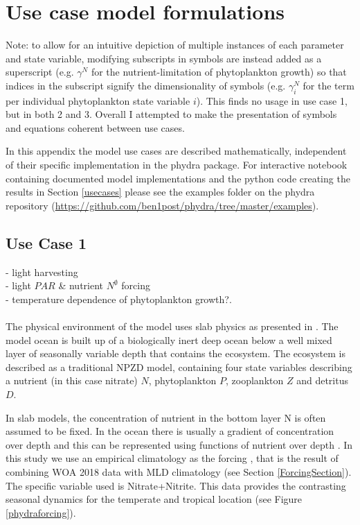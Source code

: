 \documentclass[template.tex]{subfiles}
\begin{document}
\section{Use case model formulations}

Note: to allow for an intuitive depiction of multiple instances of each parameter and state variable, modifying subscripts in symbols are instead added as a superscript (e.g. $\gamma^{N}$ for the nutrient-limitation of phytoplankton growth) so that indices in the subscript signify the dimensionality of symbols (e.g. $\gamma^{N}_i$ for the term per individual phytoplankton state variable $i$). This finds no usage in use case 1, but in both 2 and 3.
Overall I attempted to make the presentation of symbols and equations coherent between use cases.

In this appendix the model use cases are described mathematically, independent of their specific implementation in the phydra package. For interactive notebook containing documented model implementations and the python code creating the results in Section \ref{usecases} please see the examples folder on the phydra repository (\url{https://github.com/ben1post/phydra/tree/master/examples}).


\subsection{Use Case 1}


- light harvesting\\
- light $PAR$ & nutrient $N^\emptyset$ forcing\\ 
- temperature dependence of phytoplankton growth?.\\ 

\\ 
The physical environment of the model uses slab physics as presented in \citet{Evans1985ACycles}. The model ocean is built up of a biologically inert deep ocean below a well mixed layer of seasonally variable depth that contains the ecosystem. The ecosystem is described as a traditional NPZD model, containing four state variables describing a nutrient (in this case nitrate) $N$, phytoplankton $P$, zooplankton $Z$ and detritus $D$. 

In slab models, the concentration of nutrient in the bottom layer \unit{N^\emptyset} is often assumed to be fixed. In the ocean there is usually a gradient of concentration over depth and this can be represented using functions of nutrient over depth \citep{Frost1987GrazingSpp., Fasham1995VariationsAnalysis}. In this study we use an empirical climatology as the forcing , that is the result of combining WOA 2018 data with MLD climatology (see Section \ref{ForcingSection}). The specific variable used is Nitrate+Nitrite. This data provides the contrasting seasonal dynamics for the temperate and tropical location (see Figure \ref{phydraforcing}).
\end{document}
